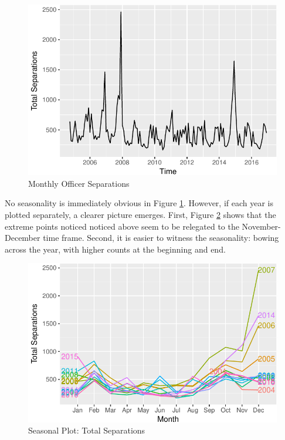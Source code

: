 \documentclass[12pt,letterpaper,toc=flat,oneside]{report}
\theoremstyle{definition}
\theoremstyle{definition}
\theoremstyle{definition}
\theoremstyle{remark}
\begin{document}
\begin{figure}[H]

{\centering \includegraphics{elliott-econometric-personnel-retention-18_files/figure-latex/response-plot-1} 

}

\caption{Monthly Officer Separations}\label{fig:response-plot}
\end{figure}

No seasonality is immediately obvious in Figure \ref{fig:response-plot}.
However, if each year is plotted separately, a clearer picture emerges.
First, Figure \ref{fig:response-season-plot} shows that the extreme
points noticed noticed above seem to be relegated to the
November-December time frame. Second, it is easier to witness the
seasonality: bowing across the year, with higher counts at the beginning
and end.

\begin{figure}[H]

{\centering \includegraphics{elliott-econometric-personnel-retention-18_files/figure-latex/response-season-plot-1} 

}

\caption{Seasonal Plot: Total Separations}\label{fig:response-season-plot}
\end{figure}
\end{document}
